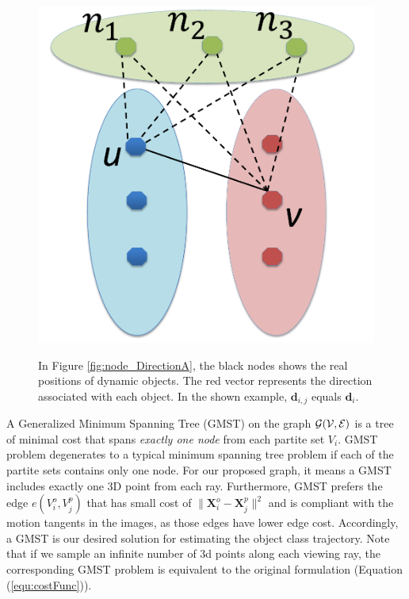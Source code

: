 \begin{figure}[t]
{    \includegraphics[height=0.19\textheight]{chapter4/resource/edgeReduction_cropped.pdf}
    \label{fig:node_edgeRemove}
}

\caption[Illustration of the motion tangent.]{In Figure \ref{fig:node_DirectionA}, the black nodes shows the real positions of dynamic objects. The red vector represents the direction associated with each object. In the shown example, $\mathbf{d}_{i,j}$ equals $\mathbf{d}_{i}$.  }
\label{fig:nodeDirection}
\end{figure}

A Generalized Minimum Spanning Tree (GMST) on the graph $\cal{G}(V,E)$ is a tree of minimal cost that spans \emph{exactly one node} from each partite set $V_i$. GMST problem degenerates to a typical minimum spanning tree problem \cite{Cormen:2001:IA:580470} if each of the partite sets contains only one node.
For our proposed graph, it means a GMST includes exactly one 3D point from each ray. Furthermore, GMST prefers the edge $e(V_i^o,V_j^p)$ that has small cost of $\|\mathbf{X}_i^o-\mathbf{X}_j^p\|^2$ and is compliant with the motion tangents in the images, as those edges have lower edge cost. Accordingly, a GMST is our desired solution for estimating the object class trajectory. Note that if we sample an infinite number of 3d points along each viewing ray, the corresponding GMST problem is equivalent to the original formulation (Equation (\ref{equ:costFunc})).%

